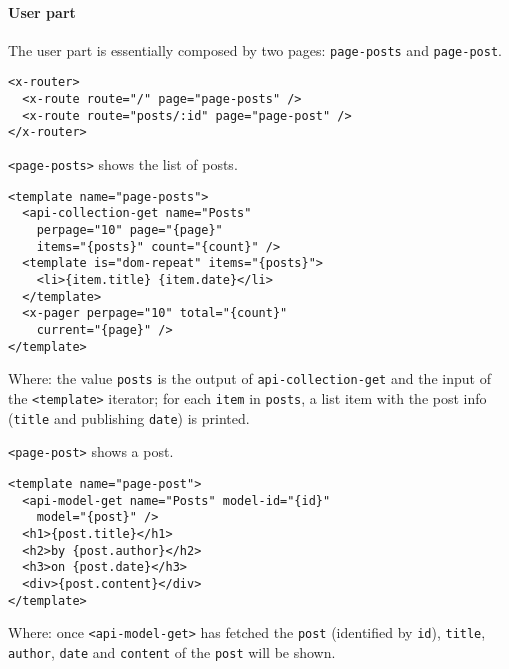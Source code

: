 \paragraph{User part}

The user part is essentially composed by two pages: \texttt{page-posts} and \texttt{page-post}.

\begin{lstlisting}[language=HTML5]
<x-router>
  <x-route route="/" page="page-posts" />
  <x-route route="posts/:id" page="page-post" />
</x-router>
\end{lstlisting}

\texttt{<page-posts>} shows the list of posts.

\begin{lstlisting}[language=HTML5]
<template name="page-posts">
  <api-collection-get name="Posts"
    perpage="10" page="{page}" 
    items="{posts}" count="{count}" />
  <template is="dom-repeat" items="{posts}">
    <li>{item.title} {item.date}</li>
  </template>
  <x-pager perpage="10" total="{count}" 
    current="{page}" />
</template>
\end{lstlisting}

Where:
the value \texttt{posts} is the output of \texttt{api-collection-get} and the input of the \texttt{<template>} iterator; for each \texttt{item} in \texttt{posts}, a list item with the post info (\texttt{title} and publishing \texttt{date}) is printed.

\vspace{0.2cm}

\texttt{<page-post>} shows a post. 

\begin{lstlisting}[language=HTML5]
<template name="page-post">
  <api-model-get name="Posts" model-id="{id}" 
    model="{post}" />
  <h1>{post.title}</h1>
  <h2>by {post.author}</h2>
  <h3>on {post.date}</h3>
  <div>{post.content}</div>
</template>
\end{lstlisting}

Where: once \texttt{<api-model-get>} has fetched the \texttt{post} (identified by \texttt{id}),
\texttt{title}, \texttt{author}, \texttt{date} and \texttt{content} of the \texttt{post} will be shown.
